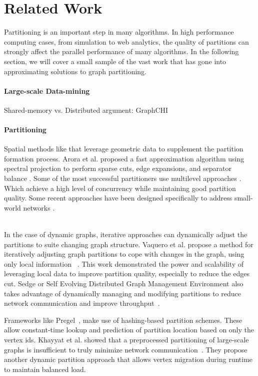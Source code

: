 \section{Related Work}
Partitioning is an important step in many algorithms.
In high performance computing cases, from simulation to web analytics, the quality of partitions can strongly affect the parallel performance of many algorithms.
In the following section, we will cover a small sample of the vast work that has gone into approximating solutions to graph partitioning.


\paragraph{Large-scale Data-mining}
Shared-memory vs. Distributed argument: GraphCHI~\cite{graphchi}


\paragraph{Partitioning}
Spatial methods like \cite{Gilbert95geometricmesh} that leverage geometric data to supplement the partition formation process.
Arora et al. proposed a fast approximation algorithm using spectral projection to perform sparse cuts, edge expansions, and separator balance \cite{arora2009expander}.
Some of the most successful partitioners use multilevel approaches \cite{karypis1998multilevel}.
Which achieve a high level of concurrency while maintaining good partition quality.
Some recent approaches have been designed specifically to address small-world networks \cite{slota2014pulp}.

 \\
In the case of dynamic graphs, iterative approaches can dynamically adjust the partitions to suite changing graph structure.
Vaquero et al. propose a method for iteratively adjusting graph partitions to cope with changes in the graph, using only local information ~\cite{Vaquero:2013:APL:2523616.2525943}.
This work demonstrated the power and scalability of leveraging local data to improve partition quality, especially to reduce the edges cut.
Sedge or Self Evolving Distributed Graph Management Environment also takes advantage of dynamically managing and modifying partitions to reduce network communication and improve throughput~\cite{Yangpart}.

Frameworks like Pregel~\cite{Malpregel}, make use of hashing-based partition schemes.
These allow constant-time lookup and prediction of partition location based on only the vertex ids.
Khayyat et al. showed that a preprocessed partitioning of large-scale graphs is insufficient to truly minimize network communication~\cite{khayyatmizan}.
They propose another dynamic partition approach that allows vertex migration during runtime to maintain balanced load.
  

